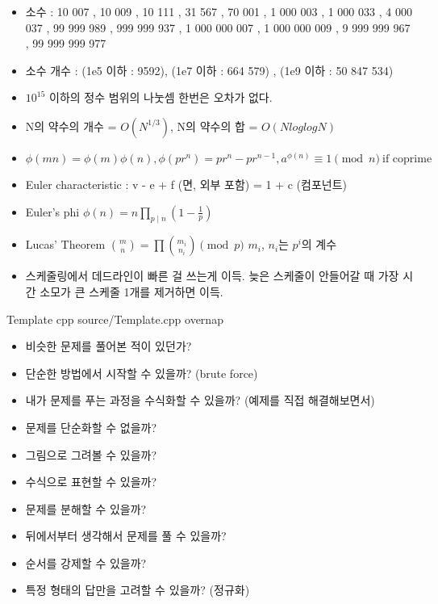 \documentclass[landscape, 10pt, a4paper, oneside, twocolumn]{extarticle}
\begin{document}
\begin{itemize}
    \item 소수 : 10 007 , 10 009 , 10 111 , 31 567 , 70 001 , 1 000 003 , 1 000 033 , 4 000 037 , 99 999 989 , 999 999 937 , 1 000 000 007 , 1 000 000 009 , 9 999 999 967 , 99 999 999 977
    \item 소수 개수 : (1e5 이하 : 9592), (1e7 이하 : 664 579) , (1e9 이하 : 50 847 534)
    \item $10^{15}$ 이하의 정수 범위의 나눗셈 한번은 오차가 없다.
    \item N의 약수의 개수 = $O(N^{1/3})$, N의 약수의 합 = $O(NloglogN)$
    \item $\phi(mn) = \phi(m) \phi(n) , \phi(pr^n) = pr^n - pr^{n-1} , a^{\phi(n)} \equiv 1 \pmod{n} \ \text{if coprime}$
\end{itemize}

\begin{itemize}  %
    \item Euler characteristic : v - e + f (면, 외부 포함) = 1 + c (컴포넌트)
    \item Euler's phi $\phi (n)=n\prod _{p\mid n}\left(1-{\frac {1}{p}}\right)$
    \item Lucas' Theorem $\binom{m}{n}=\prod\binom{m_i}{n_i} \pmod p$ $m_i$, $n_i$는 $p^i$의 계수
    \item 스케줄링에서 데드라인이 빠른 걸 쓰는게 이득. 늦은 스케줄이 안들어갈 때 가장 시간 소모가 큰 스케줄 1개를 제거하면 이득.
\end{itemize}

\Algorithm
{Template}
{}
{}
{cpp}
{source/Template.cpp}
{overnap}


\begin{itemize}
    \item 비슷한 문제를 풀어본 적이 있던가?
    \item 단순한 방법에서 시작할 수 있을까? (brute force)
    \item 내가 문제를 푸는 과정을 수식화할 수 있을까? (예제를 직접 해결해보면서)
    \item 문제를 단순화할 수 없을까?
    \item 그림으로 그려볼 수 있을까?
    \item 수식으로 표현할 수 있을까?
    \item 문제를 분해할 수 있을까?
    \item 뒤에서부터 생각해서 문제를 풀 수 있을까?
    \item 순서를 강제할 수 있을까?
    \item 특정 형태의 답만을 고려할 수 있을까? (정규화)
\end{itemize}
\end{document}
